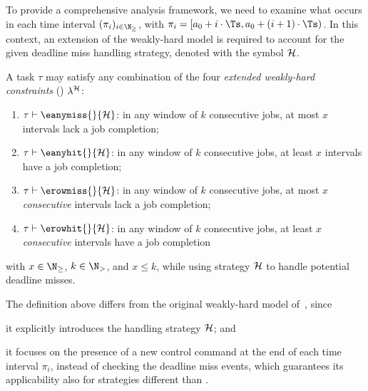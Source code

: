 To provide a comprehensive analysis framework, we need to examine what occurs in each time interval $(\pi_i)_{i \in \N_{\geq}}$, with $\pi_i = [a_0 + i\cdot \Ts, a_0 + (i+1)\cdot \Ts)$. 
In this context, an extension of the weakly-hard model is required to account for the given deadline miss handling strategy, denoted with the symbol $\mathcal{H}$.
%
\begin{definition}%
    \label{def:new-mk}%
    A task $\tau$ may satisfy any combination of the four \emph{extended weakly-hard constraints} (\ewhc{}) $\lambda^{\mathcal{H}}$:
    \begin{enumerate}[label=(\roman*)]
        \item $\tau \vdash \eanymiss{}{\strat}$: in any window of $k$ consecutive jobs, at most $x$ intervals lack a job completion;
        \item $\tau \vdash \eanyhit{}{\strat}$:  in any window of $k$ consecutive jobs, at least $x$ intervals have a job completion;
        \item $\tau \vdash \erowmiss{}{\strat}$: in any window of $k$ consecutive jobs, at most $x$ \emph{consecutive} intervals lack a job completion;
        \item $\tau \vdash \erowhit{}{\strat}$: in any window of $k$ consecutive jobs, at least $x$ \emph{consecutive} intervals have a job completion
    \end{enumerate}
    with $x\in \N_{\geq}$, $k \in \N_{>}$, and $x\leq k$, while using strategy $\mathcal{H}$ to handle potential deadline misses.
\end{definition}
%
The definition above differs from the original weakly-hard model of~\cite{Bernat:2001}, since
\begin{enumerate*}[label=(\roman*)]
    \item it explicitly introduces the handling strategy $\mathcal{H}$; and
    \item it focuses on the presence of a new control command at the end of each time interval $\pi_i$, instead of checking the deadline miss events, which guarantees its applicability also for strategies different than \tK{}.
\end{enumerate*}

